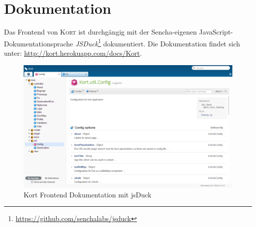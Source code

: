 \section{Dokumentation}

Das Frontend von \textsc{Kort} ist durchgängig mit der Sencha-eigenen JavaScript-Dokumentationsprache \emph{JSDuck}\footnote{\url{https://github.com/senchalabs/jsduck}} dokumentiert.
Die Dokumentation findet sich unter: \url{http://kort.herokuapp.com/docs/Kort}.

\begin{figure}[H]
	\centering
	\includegraphics[width=\textwidth]{images/implementation/frontend/kort-documentation}
	\caption{Kort Frontend Dokumentation mit jsDuck}
	\label{image-kort-documentation}
\end{figure}